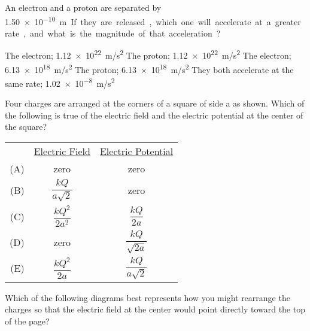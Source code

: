 \documentclass{../../oss-classkick-exam}
\begin{document}
\genheader


\genmultidirections

\raggedcolumns
\begin{questions}
  \question An electron and a proton are separated by \SI{1.50e-10}\metre. If
  they are released, which one will accelerate at a greater rate, and what is
  the magnitude of that acceleration?
  \begin{choices}
    \choice The electron; \SI{1.12e22}{m/s^2}
    \choice The proton; \SI{1.12e22}{m/s^2}
    \choice The electron; \SI{6.13e18}{m/s^2}
    \choice The proton; \SI{6.13e18}{m/s^2}
    \choice They both accelerate at the same rate; \SI{1.02e-8}{m/s^2}
  \end{choices}
  
  \question Four charges are arranged at the corners of a square of side a as
  shown. Which of the following is true of the electric field and the electric
  potential at the center of the square?
  \begin{center}
  \end{center}
  \begin{tabular}{rcc}
    & \underline{Electric Field} & \underline{Electric Potential}\\
    (A) & zero & zero \\
    (B) & $\dfrac{kQ}{a\sqrt 2}$ & zero \\
    (C) & $\dfrac{kQ^2}{2a^2}$ &  $\dfrac{kQ}{2a}$\\
    (D) & zero &  $\dfrac{kQ}{\sqrt{2a}}$\\
      (E) & $\dfrac{kQ^2}{2a}$ & $\dfrac{kQ}{a\sqrt 2}$
  \end{tabular}
   
  \question Which of the following diagrams best represents how you might
  rearrange the charges so that the electric field at the center would point
  directly toward the top of the page?


\end{questions}
\end{document}
